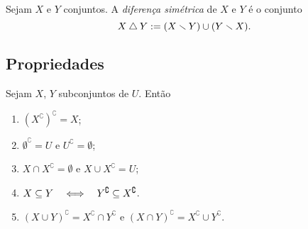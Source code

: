 \begin{definition}
Sejam $X$ e $Y$ conjuntos. A \emph{diferença simétrica} de $X$ e $Y$ é o conjunto
	\begin{equation*}
	X \mathbin{\triangle} Y := (X \smallsetminus Y) \cup (Y \smallsetminus X).
	\end{equation*}
\end{definition}

\subsection{Propriedades}

\begin{proposition}
Sejam $X$, $Y$ subconjuntos de $U$. Então
	\begin{enumerate}
	\item $(X^\complement)^\complement = X$;
	\item $\emptyset^\complement = U$ e $U^\complement = \emptyset$;
	\item $X \cap X^\complement = \emptyset$ e $X \cup X^\complement = U$;
	\item $X \subseteq Y \quad \Longleftrightarrow \quad Y^\complement \subseteq X^\complement$.
	\item $(X \cup Y)^\complement = X^\complement \cap Y^\complement$ e $(X \cap Y)^\complement = X^\complement \cup Y^\complement$.
	\end{enumerate}
\end{proposition}


